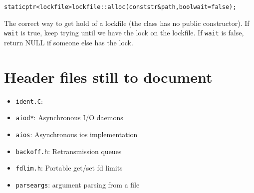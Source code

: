 \documentclass[11pt]{article}
\begin{document}
\begin{alltt}
static ptr<lockfile> lockfile::alloc (const str &path, bool wait = false);
\end{alltt}
The correct way to get hold of a lockfile (the class has no public
constructor).   If \texttt{wait} is true, keep trying until we have
the lock on the lockfile.  If \texttt{wait} is false, return NULL if
someone else has the lock. 

 



\section{Header files still to document}

\begin{itemize}
\item \texttt{ident.C}: 
\item \texttt{aiod*}: Asynchronous I/O daemons
\item \texttt{aios}: Asynchronous ios implementation
\item \texttt{backoff.h}: Retransmission queues
\item \texttt{fdlim.h}: Portable get/set fd limits
\item \texttt{parseargs}: argument parsing from a file
\end{itemize}

\printindex
\end{document}
